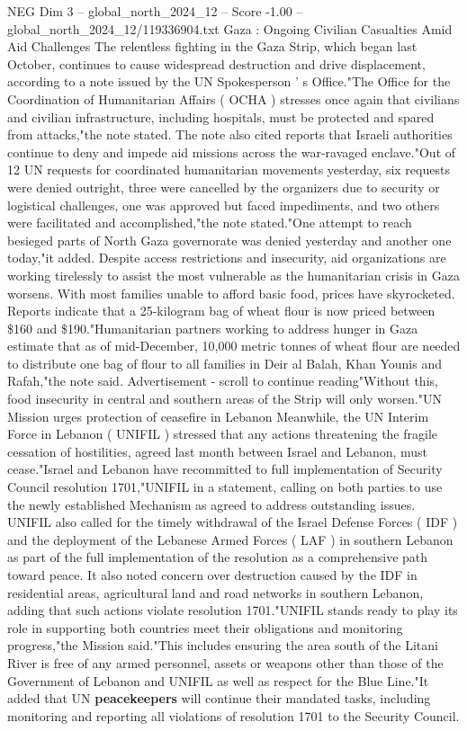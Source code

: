 \begin{textsample}{NEG Dim 3 – global\_north\_2024\_12 – Score -1.00 – global\_north\_2024\_12/119336904.txt}  \label{ex:f3_neg_241}
Gaza : Ongoing Civilian Casualties Amid Aid Challenges The relentless fighting in the Gaza Strip, which began last October, continues to cause widespread destruction and drive displacement, according to a note issued by the UN Spokesperson ' s Office."The Office for the Coordination of Humanitarian Affairs ( OCHA ) stresses once again that civilians and civilian infrastructure, including hospitals, must be protected and spared from attacks,"the note stated.
The note also cited reports that Israeli authorities continue to deny and impede aid missions across the war-ravaged enclave."Out of 12 UN requests for coordinated humanitarian movements yesterday, six requests were denied outright, three were cancelled by the organizers due to security or logistical challenges, one was approved but faced impediments, and two others were facilitated and accomplished,"the note stated."One attempt to reach besieged parts of North Gaza governorate was denied yesterday and another one today,"it added.
Despite access restrictions and insecurity, aid organizations are working tirelessly to assist the most vulnerable as the humanitarian crisis in Gaza worsens.
With most families unable to afford basic food, prices have skyrocketed.
Reports indicate that a 25-kilogram bag of wheat flour is now priced between \$160 and \$190."Humanitarian partners working to address hunger in Gaza estimate that as of mid-December, 10,000 metric tonnes of wheat flour are needed to distribute one bag of flour to all families in Deir al Balah, Khan Younis and Rafah,"the note said.
Advertisement - scroll to continue reading"Without this, food insecurity in central and southern areas of the Strip will only worsen."UN Mission urges protection of ceasefire in Lebanon Meanwhile, the UN Interim Force in Lebanon ( UNIFIL ) stressed that any actions threatening the fragile cessation of hostilities, agreed last month between Israel and Lebanon, must cease."Israel and Lebanon have recommitted to full implementation of Security Council resolution 1701,"UNIFIL in a statement, calling on both parties to use the newly established Mechanism as agreed to address outstanding issues.
UNIFIL also called for the timely withdrawal of the Israel Defense Forces ( IDF ) and the deployment of the Lebanese Armed Forces ( LAF ) in southern Lebanon as part of the full implementation of the resolution as a comprehensive path toward peace.
It also noted concern over destruction caused by the IDF in residential areas, agricultural land and road networks in southern Lebanon, adding that such actions violate resolution 1701."UNIFIL stands ready to play its role in supporting both countries meet their obligations and monitoring progress,"the Mission said."This includes ensuring the area south of the Litani River is free of any armed personnel, assets or weapons other than those of the Government of Lebanon and UNIFIL as well as respect for the Blue Line."It added that UN \textbf{peacekeepers} will continue their mandated tasks, including monitoring and reporting all violations of resolution 1701 to the Security Council.

\end{textsample}

